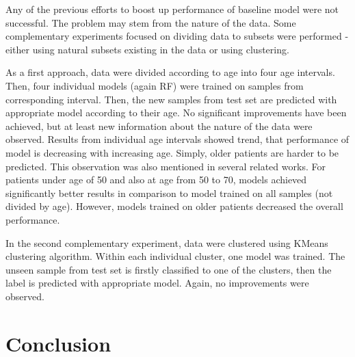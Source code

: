\documentclass[runningheads]{llncs}
\begin{document}
Any of the previous efforts to boost up performance of baseline model were not successful. The problem may stem from the nature of the data. Some complementary experiments focused on dividing data to subsets were performed - either using natural subsets existing in the data or using clustering.

As a first approach, data were divided according to age into four age intervals. Then, four individual models (again RF) were trained on samples from corresponding interval. Then, the new samples from test set are predicted with appropriate model according to their age. No significant improvements have been achieved, but at least new information about the nature of the data were observed. Results from individual age intervals showed trend, that performance of model is decreasing with increasing age. Simply, older patients are harder to be predicted. This observation was also mentioned in several related works. For patients under age of 50 and also at age from 50 to 70, models achieved significantly better results in comparison to model trained on all samples (not divided by age). However, models trained on older patients decreased the overall performance.

In the second complementary experiment, data were clustered using KMeans clustering algorithm. Within each individual cluster, one model was trained. The unseen sample from test set is firstly classified to one of the clusters, then the label is predicted with appropriate model. Again, no improvements were observed.


\section{Conclusion}
\end{document}
